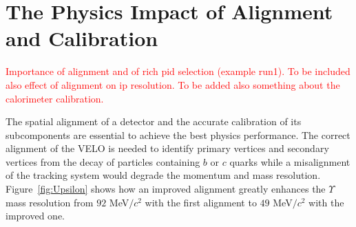 \section{The Physics Impact of Alignment and Calibration}
\textcolor{red}{Importance of alignment and of rich pid selection (example run1).
To be included also effect of alignment on ip resolution.
To be added also something about the calorimeter calibration.}

The spatial alignment of a detector and the accurate calibration of its
subcomponents are essential to achieve the best physics
performance. The correct alignment of the VELO is needed to identify primary
vertices and secondary vertices from the decay of particles containing $b$ or
$c$ quarks while a misalignment of the tracking system would degrade the
momentum and mass resolution.  Figure~\ref{fig:Upsilon} shows how an improved
alignment greatly enhances the $\Upsilon$ mass resolution from $92$ MeV$/c^2$
with the first alignment to $49$ MeV$/c^2$ with the improved one.

